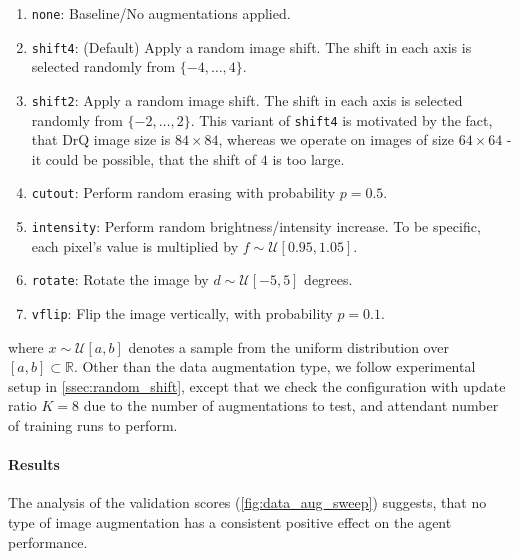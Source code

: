 \documentclass[en]{pracamgr}
\begin{document}
\begin{enumerate}
  \item {\tt none}: Baseline/No augmentations applied.
  \item {\tt shift4}: (Default) Apply a random image shift. The shift in each axis is selected randomly from $\{-4, \ldots, 4\}$.
  \item {\tt shift2}: Apply a random image shift. The shift in each axis is selected randomly from $\{-2, \ldots, 2\}$. This variant of {\tt shift4} is motivated by the fact, that DrQ image size is $84 \times 84$, whereas we operate on images of size $64 \times 64$ - it could be possible, that the shift of $4$ is too large.
  \item {\tt cutout}: Perform random erasing with probability $p = 0.5$.
  \item {\tt intensity}: Perform random brightness/intensity increase. To be specific, each pixel's value is multiplied by $f \sim \mathcal{U}[0.95, 1.05]$.
  \item {\tt rotate}: Rotate the image by $d \sim \mathcal{U}[-5, 5]$ degrees.
  \item {\tt vflip}: Flip the image vertically, with probability $p = 0.1$.
\end{enumerate}

where $x \sim \mathcal{U}[a, b]$ denotes a sample from the uniform distribution over $[a, b] \subset \mathbb{R}$. Other than the data augmentation type, we follow experimental setup in \autoref{ssec:random_shift}, except that we check the configuration with update ratio $K = 8$ due to the number of augmentations to test, and attendant number of training runs to perform.

\paragraph{Results} The analysis of the validation scores (\autoref{fig:data_aug_sweep}) suggests, that no type of image augmentation has a consistent positive effect on the agent performance.
\end{document}
